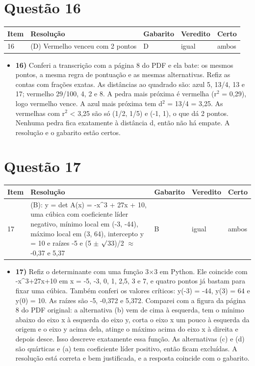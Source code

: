 \documentclass{article}%
\begin{document}
\section*{Questão 16}%
\begin{longtable}{@{}p{} p{} p{} p{} p{}@{}}\toprule Item & Resolução & Gabarito & Veredito & Certo \\ \midrule
16 & (D) Vermelho venceu com 2 pontos & D & igual & ambos \\
\bottomrule\end{longtable}%
\begin{itemize}%
\item%
\textbf{16)} Conferi a transcrição com a página 8 do PDF e ela bate: os mesmos pontos, a mesma regra de pontuação e as mesmas alternativas. Refiz as contas com frações exatas. As distâncias ao quadrado são: azul 5, 13/4, 13 e 17; vermelho 29/100, 4, 2 e 8. A pedra mais próxima é vermelha (r$^2$ = 0,29), logo vermelho vence. A azul mais próxima tem d$^2$ = 13/4 = 3,25. As vermelhas com r$^2$ < 3,25 são só (1/2, 1/5) e (-1, 1), o que dá 2 pontos. Nenhuma pedra fica exatamente à distância d, então não há empate. A resolução e o gabarito estão certos.%
\end{itemize}%
\section*{Questão 17}%
\begin{longtable}{@{}p{} p{} p{} p{} p{}@{}}\toprule Item & Resolução & Gabarito & Veredito & Certo \\ \midrule
17 & (B): y = det A(x) = {-}x\^{}3 + 27x + 10, uma cúbica com coeficiente líder negativo, mínimo local em ({-}3, {-}44), máximo local em (3, 64), intercepto y = 10 e raízes {-}5 e (5 $\pm$ $\surd$33)/2 $\approx$ {-}0,37 e 5,37 & B & igual & ambos \\
\bottomrule\end{longtable}%
\begin{itemize}%
\item%
\textbf{17)} Refiz o determinante com uma função 3$\times$3 em Python. Ele coincide com {-}x\^{}3+27x+10 em x = {-}5, {-}3, 0, 1, 2,5, 3 e 7, e quatro pontos já bastam para fixar uma cúbica. Também conferi os valores críticos: y({-}3) = {-}44, y(3) = 64 e y(0) = 10. As raízes são {-}5, {-}0,372 e 5,372. Comparei com a figura da página 8 do PDF original: a alternativa (b) vem de cima à esquerda, tem o mínimo abaixo do eixo x à esquerda do eixo y, corta o eixo x um pouco à esquerda da origem e o eixo y acima dela, atinge o máximo acima do eixo x à direita e depois desce. Isso descreve exatamente essa função. As alternativas (c) e (d) são quárticas e (a) tem coeficiente líder positivo, então ficam excluídas. A resolução está correta e bem justificada, e a resposta coincide com o gabarito.%
\end{itemize}%
\end{document}
